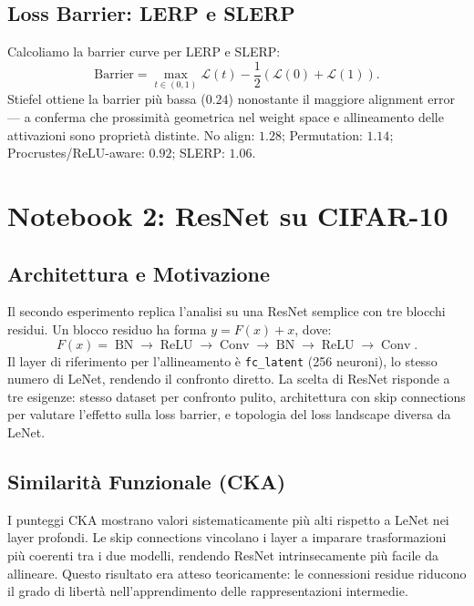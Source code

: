 \documentclass[11pt, a4paper]{article}
\begin{document}
\subsection{Loss Barrier: LERP e SLERP}

Calcoliamo la barrier curve per LERP e SLERP:
\[
\text{Barrier} = \max_{t \in (0,1)} \mathcal{L}(t) - \frac{1}{2}\left(\mathcal{L}(0) + \mathcal{L}(1)\right).
\]
Stiefel ottiene la barrier più bassa ($0.24$) nonostante il maggiore alignment error — a conferma che prossimità geometrica nel weight space e allineamento delle attivazioni sono proprietà distinte. No align: $1.28$; Permutation: $1.14$; Procrustes/ReLU-aware: $0.92$; SLERP: $1.06$.

\section{Notebook 2: ResNet su CIFAR-10}

\subsection{Architettura e Motivazione}

Il secondo esperimento replica l'analisi su una ResNet semplice con tre blocchi residui. Un blocco residuo ha forma $y = F(x) + x$, dove:
\[
F(x) = \operatorname{BN} \to \operatorname{ReLU} \to \operatorname{Conv} \to \operatorname{BN} \to \operatorname{ReLU} \to \operatorname{Conv}.
\]
Il layer di riferimento per l'allineamento è \texttt{fc\_latent} (256 neuroni), lo stesso numero di LeNet, rendendo il confronto diretto. La scelta di ResNet risponde a tre esigenze: stesso dataset per confronto pulito, architettura con skip connections per valutare l'effetto sulla loss barrier, e topologia del loss landscape diversa da LeNet.

\subsection{Similarità Funzionale (CKA)}

I punteggi CKA mostrano valori sistematicamente più alti rispetto a LeNet nei layer profondi. Le skip connections vincolano i layer a imparare trasformazioni più coerenti tra i due modelli, rendendo ResNet intrinsecamente più facile da allineare. Questo risultato era atteso teoricamente: le connessioni residue riducono il grado di libertà nell'apprendimento delle rappresentazioni intermedie.
\end{document}
